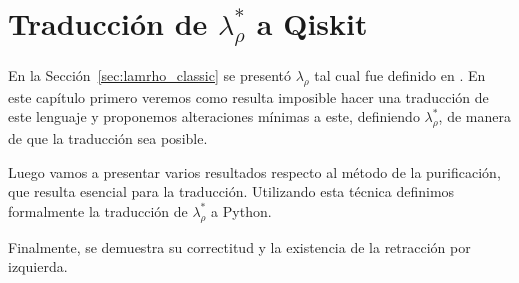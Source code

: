 \chapter{\texorpdfstring{Traducción de $\lambda_\rho^*$ a Qiskit}{Traducción de Lambda Rho* a Qiskit}}
\label{ch:traduccion}

En la Sección~\ref{sec:lamrho_classic} se presentó $\lambda_\rho$ tal cual fue definido en \cite{lamrho}. En este capítulo primero veremos como resulta imposible hacer una traducción de este lenguaje y proponemos alteraciones mínimas a este, definiendo $\lambda_\rho^*$, de manera de que la traducción sea posible.

Luego vamos a presentar varios resultados respecto al método de la purificación, que resulta esencial para la traducción. Utilizando esta técnica definimos formalmente la traducción de $\lambda_\rho^*$ a Python.

Finalmente, se demuestra su correctitud y la existencia de la retracción por izquierda.

